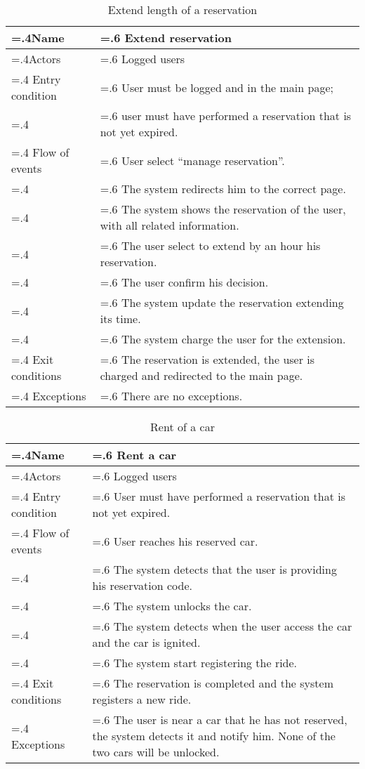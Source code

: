 \documentclass[10pt, a4paper,titlepage]{article}
\begin{document}
\begin{table}[h]
\caption{Extend length of a reservation} \label{tab:scenario6}
\begin{tabularx}{\textwidth}{|>{\hsize=.4\hsize}X|>{\hsize=.6\hsize}X|}
\hline
Name & Extend reservation \\
\hline
Actors & Logged users \\
\hline
Entry condition &  User must be logged and in the main page;\\
& user must have performed a reservation that is not yet expired. \\
\hline
Flow of events & User select “manage reservation”.\\
& The system redirects him to the correct page.\\
& The system shows the reservation of the user, with all related information.\\
& The user select to extend by an hour his reservation.\\
& The user confirm his decision.\\
& The system update the reservation extending its time.\\
& The system charge the user for the extension.\\
\hline
Exit conditions & The reservation  is extended, the user is charged and redirected to the main page.\\
\hline
Exceptions & There are no exceptions.\\
\hline
\end{tabularx}
\end{table}
\begin{table}[h]
\caption{Rent of a car} \label{tab:scenario7}
\begin{tabularx}{\textwidth}{|>{\hsize=.4\hsize}X|>{\hsize=.6\hsize}X|}
\hline
Name & Rent a car \\
\hline
Actors & Logged users \\
\hline
Entry condition &  User must have performed a reservation that is not yet expired. \\
\hline
Flow of events & User reaches his reserved car.\\
& The system detects that the user is providing his reservation code.\\
& The system unlocks the car.\\
& The system detects when the user access the car and the car is ignited.\\
& The system start registering the ride.\\
\hline
Exit conditions & The reservation is completed and the system registers a new ride.\\
\hline
Exceptions & The user is near a car that he has not reserved, the system detects it and notify him. None of the two cars will be unlocked.\\
\hline
\end{tabularx}
\end{table}
\end{document}
